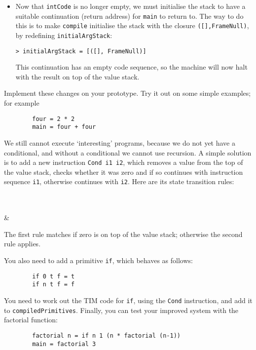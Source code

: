 \begin{itemize}
\item
Now that \mbox{\tt intCode} is no longer empty, we must initialise
the stack to have
a suitable continuation (return address) for \mbox{\tt main} to return to.
The way to do this is to make \mbox{\tt compile} initialise the stack with the
closure \mbox{\tt ([],FrameNull)}, by redefining \mbox{\tt initialArgStack}:
\begin{verbatim}
> initialArgStack = [([], FrameNull)]
\end{verbatim}
%
This continuation has an empty code sequence, so
the machine will now halt with the result on top of the value stack.
\end{itemize}

\begin{exercise}
Implement these changes on your prototype.  Try it out on some simple
examples; for example
\begin{verbatim}
        four = 2 * 2
        main = four + four
\end{verbatim}
\end{exercise}

\begin{exercise}
We still cannot execute `interesting' programs, because we do not yet
have a conditional,
and without a conditional we cannot use recursion.
A simple solution is to add a new instruction \mbox{\tt Cond\ i1\ i2}, which
removes a value from the top of the value stack, checks whether it was zero and
if so continues with instruction sequence \mbox{\tt i1}, otherwise continues with
\mbox{\tt i2}.  Here are its state transition rules:
\begin{etimruleV}
        {}
\\ \hline
{}
        {} \\
& 
\end{etimruleV}
The first rule matches if zero is on top of the value stack; otherwise the
second rule applies.

You also need to add a primitive \mbox{\tt if}, which
behaves as follows:
\begin{verbatim}
        if 0 t f = t
        if n t f = f
\end{verbatim}
You need to work out the TIM code for \mbox{\tt if}, using the \mbox{\tt Cond} instruction,
and add it to \mbox{\tt compiledPrimitives}.  Finally, you can test your improved
system with the factorial function:
\sloppy
\begin{verbatim}
        factorial n = if n 1 (n * factorial (n-1))
        main = factorial 3
\end{verbatim}
\end{exercise}

